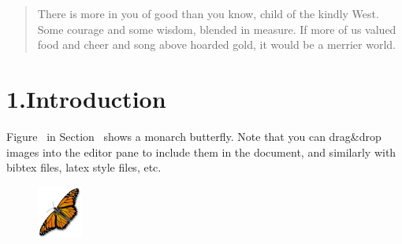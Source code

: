 \documentclass[twocolumn,10pt]{article}
\begin{document}
\mdxtitleblockstart{}
\mdxauthorstart{}


\mdxauthorend\mdxauthorstart{}


\mdxauthorend\mdtitleauthorrunning{}{}\mdxtitleblockend%

\begin{abstract}%

\noindent{}There is more in you of good than you know, child of the kindly West.
Some courage and some wisdom, blended in measure. If more of us valued
food and cheer and song above hoarded gold, it would be a merrier world.%
\end{abstract}%

\section{1.\hspace*{0.5em}Introduction}\label{sec-intro}%

\noindent{}Figure~ in Section~ shows a monarch butterfly.
Note that you can drag\&drop images into the editor pane to include them in
the document, and similarly with bibtex files, latex style files, etc.%

\begin{figure}[h]%
\begin{mdcenter}%

\noindent{}\includegraphics[keepaspectratio=true,width=4em]{images/butterfly}{}%

\mdhr{}%

\noindent{}%
\end{mdcenter}\label{fig-butterfly}%
\end{figure}%
\end{document}
